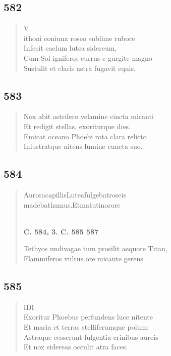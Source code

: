 \documentclass[11pt, a4paper]{report}
\begin{document}
            \subsection*{582}
      \begin{verse}
      V \\ ithoni coniunx roseo sublime rubore \\ Infecit caelum lutea sidereum, \\ Cum Sol igniferos currus e gurgite magno \\ Sustulit et claris astra fugavit equis. \\ 
      \end{verse}
  
            \subsection*{583}
      \begin{verse}
      Nox abit astrifero velamine cincta micanti \\ Et redigit stellas, exoriturque dies. \\ Emicat oceano Phoebi rota clara relicto \\ Inlustratque nitens lumine cuncta suo. \\ 
      \end{verse}
  
            \subsection*{584}
      \begin{verse}
      AuroracapillisLuteafulgebatroseis \\ madebathumus.Etmatutinorore \\ 
        ﻿\pagebreak 
    \begin{center} \textbf{C. 584, 3. C. 585 587} \end{center} \marginpar{[81]} Tethyos undivagae tum prosilit aequore Titan, \\ Flammiferos vultus ore micante gerens. \\ 
      \end{verse}
  
            \subsection*{585}
      \begin{verse}
      IDI \\ Exoritur Phoebus perfundens luce nitente \\ Et maria et terras stelliferumque polum; \\ Astraque cesserunt fulgentia crinibus aureis \\ Et nox sidereas occulit atra faces. \\ 
      \end{verse}
  
\end{document}
